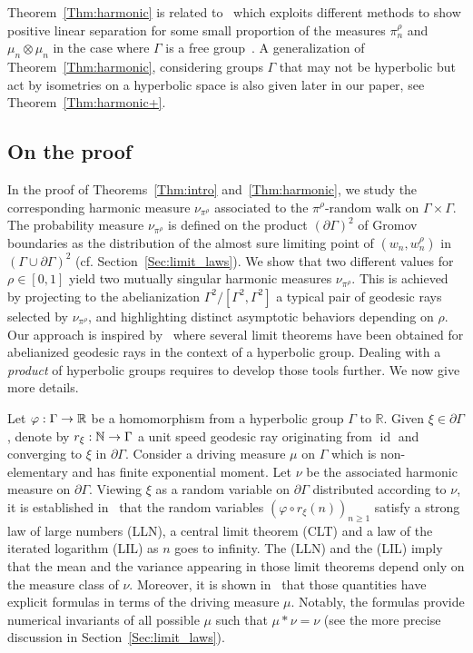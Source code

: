 \documentclass[10pt]{amsart}
\theoremstyle{definition}\newtheorem{defi}[theo]{Definition}\newtheorem{rema}[theo]{Remark}\newtheorem{exam}[theo]{Example}\newtheorem{exem}[theo]{Example}\newtheorem{nota}[theo]{Notation}
\DeclareMathOperator{\id}{id}
\newcommand{\f}{\varphi}
\newcommand{\N}{\mathbb{N}}
\newcommand{\R}{\mathbb{R}}
\renewcommand{\(}{\left(}
\renewcommand{\)}{\right)}
\renewcommand*{\to}{\mathchoice{\longrightarrow}{\rightarrow}{\rightarrow}{\rightarrow}}
\begin{document}
Theorem~\ref{Thm:harmonic} is related to~\cite{BenjaminiBrieussel} which exploits different methods to show positive linear separation for some small proportion of the measures $\pi^\rho_n$ and $\mu_n\otimes\mu_n$ in the case where $\Gamma$ is a free group~\cite[Theorem~4.2]{BenjaminiBrieussel}. A generalization of Theorem~\ref{Thm:harmonic}, considering groups $\Gamma$ that may not be hyperbolic but act by isometries on a hyperbolic space is also given later in our paper, see Theorem~\ref{Thm:harmonic+}.


\subsection{On the proof}

In the proof of Theorems~\ref{Thm:intro} and~\ref{Thm:harmonic}, we study the corresponding harmonic measure $\nu_{\pi^\rho}$ associated to the $\pi^\rho$-random walk on $\Gamma \times \Gamma$. The probability measure $\nu_{\pi^\rho}$ is defined on the product $(\partial \Gamma)^2$ of Gromov boundaries as the distribution of the almost sure limiting point of $(w_n, w_n^\rho)$ in $(\Gamma \cup \partial \Gamma)^2$ (cf. Section~\ref{Sec:limit_laws}). We show that two different values for $\rho \in [0, 1]$ yield two mutually singular harmonic measures $\nu_{\pi^\rho}$. This is achieved by projecting to the abelianization $\Gamma^2/[\Gamma^2, \Gamma^2]$ a typical pair of geodesic rays selected by $\nu_{\pi^\rho}$, and highlighting distinct asymptotic behaviors depending on $\rho$. Our approach is inspired by~\cite{BenardWinding} where several limit theorems have been obtained for abelianized geodesic rays in the context of a hyperbolic group. Dealing with a \emph{product} of hyperbolic groups requires to develop those tools further. We now give more details.


Let $\f:\Gamma \to \R$ be a homomorphism from a hyperbolic group $\Gamma$ to $\R$. Given $\xi\in \partial \Gamma$, denote by $r_\xi: \N \to \Gamma$ a unit speed geodesic ray originating from $\id$ and converging to $\xi$ in $\partial \Gamma$. Consider a driving measure $\mu$ on $\Gamma$ which is non-elementary and has finite exponential moment. Let $\nu$ be the associated harmonic measure on $\partial \Gamma$. Viewing $\xi$ as a random variable on $\partial \Gamma$ distributed according to $\nu$, it is established in~\cite[Theorem~1.4]{BenardWinding} that the random variables $(\f\circ r_\xi(n))_{n\geq 1}$ satisfy a strong law of large numbers (LLN), a central limit theorem (CLT) and a law of the iterated logarithm (LIL) as $n$ goes to infinity. The (LLN) and the (LIL) imply that the mean and the variance appearing in those limit theorems depend only on the measure class of $\nu$. Moreover, it is shown in~\cite{BenardWinding} that those quantities have explicit formulas in terms of the driving measure $\mu$. Notably, the formulas provide numerical invariants of all possible $\mu$ such that $\mu\ast \nu=\nu$ (see the more precise discussion in Section~\ref{Sec:limit_laws}).
\end{document}
